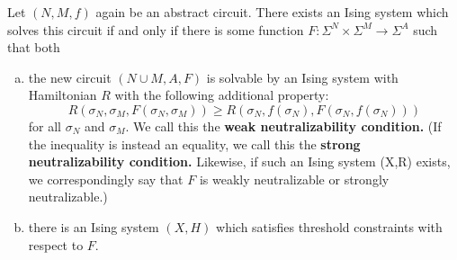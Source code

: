 \documentclass{article}
\begin{document}
\begin{lem}\label{lem:threshold-constraints}
  Let $(N, M, f)$ again be an abstract circuit. There exists an Ising system which solves this circuit if and only if there is some function $F:\Sigma^N\times\Sigma^M \to \Sigma^A$ such that both
  \begin{enumerate}[(a)]
    \item the new circuit $(N\cup M, A, F)$ is solvable by an Ising system with Hamiltonian $R$ with the following additional property:
      \begin{equation}\label{eqn:weak-neutralizability}\tag{$\dagger$}
        R(\sigma_N, \sigma_M, F(\sigma_N,\sigma_M)) \geq R(\sigma_N, f(\sigma_N), F(\sigma_N, f(\sigma_N)))
      \end{equation}
      for all $\sigma_N$ and $\sigma_M$. We call this the \textbf{weak neutralizability condition.} (If the inequality is instead an equality, we call this the \textbf{strong neutralizability condition.} Likewise, if such an Ising system (X,R) exists, we correspondingly say that $F$ is weakly neutralizable or strongly neutralizable.)
    \item there is an Ising system $(X, H)$ which satisfies threshold constraints with respect to $F$.
  \end{enumerate} 
\end{lem}
\end{document}
